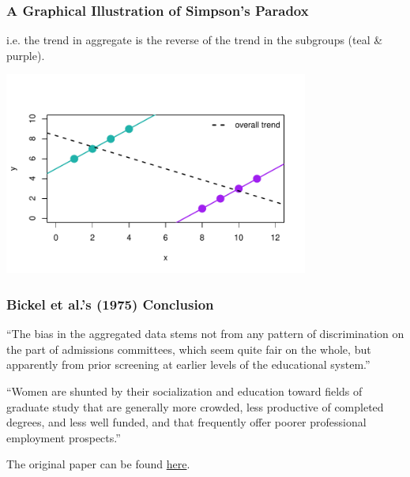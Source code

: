 \documentclass[handout]{beamer}
\newcommand{\blue}[1]{\textcolor{blue2}{#1}}
\begin{document}
\begin{frame}
\frametitle{A Graphical Illustration of Simpson's Paradox}
i.e. the trend in aggregate is the \blue{reverse} of the trend in the subgroups (teal \& purple).
\begin{center}
\includegraphics[width=10cm]{figure/simpsons5.pdf}
\end{center}

\end{frame}



\begin{frame}
\frametitle{Bickel et al.'s (1975) Conclusion}

``The bias in the aggregated data stems \blue{not from any pattern of discrimination on the part of admissions committees}, which seem quite fair on the whole, \pause but apparently from \blue{prior screening at earlier levels of the educational system}.''

\vspace{0.25in}

\pause ``Women are shunted by their socialization and education toward fields of graduate study that are generally more crowded, less productive of completed degrees, and less well funded, and that frequently offer poorer professional employment prospects.''

\vspace{0.25in}

The original paper can be found \blue{\href{http://www.unc.edu/~nielsen/soci708/cdocs/Berkeley\_admissions\_bias.pdf}{here}}.

\end{frame}
\end{document}
